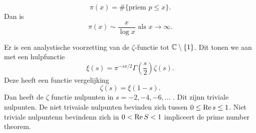 \begin{stelling}
	\[
		\pi(x) = \# \{\text{priem } p \le x\} 
	.\] 
	Dan is \[
		\pi(x) \sim \frac{x}{\log x} \text{ als } x \to \infty
	.\] 
\end{stelling}
Er is een analystische voorzetting van de $\zeta$-functie tot $\mathbb{C} \setminus \{1\} $. 
Dit tonen we aan met een hulpfunctie  \[
	\xi (s) = \pi^{-s x/2}\Gamma\left(\frac{s}{2}\right) \zeta(s)
.\] 
Deze heeft een functie vergelijking
\[
	\zeta(s) = \xi(1-s)
.\]
Dan heeft de $\zeta$ functie nulpunten in $s = -2, -4, -6, \ldots$ . Dit zijnn triviale nulpunten.
De niet trivaiale nulpunten bevinden zich tussen $0 \le \operatorname{Re} s \le 1$. 
Niet triviale nulpuntenn bevindenn zich in $0 < \operatorname{Re} S < 1$ impliceert de prime number theorem.
